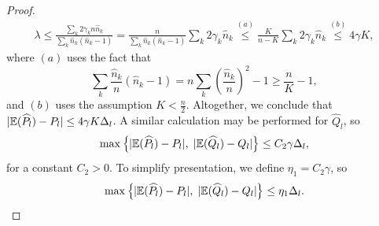 \documentclass{article}
\begin{document}
\begin{proof}
\begin{align*}
\lambda \leq \frac{ \sum_k 2 \gamma_k n \hat{n}_k }{\sum_k \hat{n}_k(\hat{n}_k - 1)} = \frac{n}{\sum_k \hat{n}_k (\hat{n}_k - 1) } \sum_k 2 \gamma_k \hat{n}_k \stackrel{(a)}{\leq} \frac{K}{n-K} \sum_k 2 \gamma_k \hat{n}_k \stackrel{(b)}{\leq} 4 \gamma K,
\end{align*}
where $(a)$ uses the fact that
\begin{equation}
\label{EqnSmall}
\sum_k \frac{\hat{n}_k }{n} (\hat{n}_k - 1) = n \sum_k \left( \frac{\hat{n}_k}{n} \right)^2 - 1 \geq \frac{n}{K} - 1,
\end{equation}
and $(b)$ uses the assumption $K < \frac{n}{2}$. 
Altogether, we conclude that $|{\mathbb E} (\widehat{P}_l) - P_l | \leq 4 \gamma K \Delta_l$. A similar calculation may be performed for $\hat Q_l$, so
\begin{equation*}
\max\left\{|{\mathbb E} (\widehat{P}_l) - P_l |, \; |{\mathbb E}(\widehat{Q}_l) - Q_l |\right\} \leq C_2 \gamma \Delta_l,
\end{equation*}
for a constant $C_2 > 0$. To simplify presentation, we define $\eta_1 = C_2 \gamma$, so
\begin{equation} \label{eq: A1.5}
\max\left\{|{\mathbb E}(\widehat{P}_l) - P_l |, \; |{\mathbb E}(\widehat{Q}_l) - Q_l|\right\} \leq \eta_1 \Delta_l.
\end{equation}


\end{proof}
\end{document}
